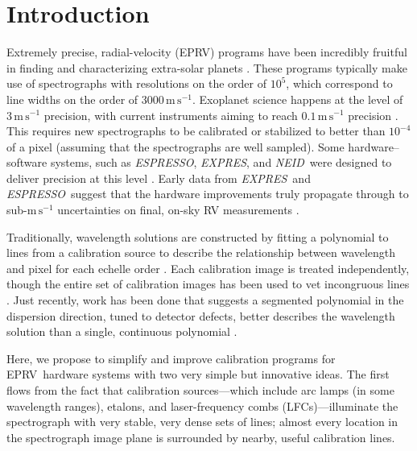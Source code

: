 \documentclass[modern]{aastex63}
\newcommand{\project}[1]{\textsl{#1}}
\newcommand{\acronym}[1]{{\small{#1}}}
\newcommand{\expres}{\project{\acronym{EXPRES}}}
\newcommand{\espresso}{\project{\acronym{ESPRESSO}}}
\newcommand{\neid}{\project{\acronym{NEID}}}
\newcommand{\eprv}{\acronym{EPRV}}
\newcommand{\lfc}{\acronym{LFC}}
\newcommand{\mps}{\mathrm{m\,s^{-1}}}
\begin{document}

\section{Introduction} 
Extremely precise, radial-velocity (\eprv) programs have been incredibly fruitful in finding and characterizing extra-solar planets \citep{mayor2011, bonfils2013, plavchan2015, butler2017}.  These programs typically make use of spectrographs with resolutions on the order of $10^5$, which correspond to line widths on the order of $3000\,\mps$.  Exoplanet science happens at the level of $3\,\mps$ precision, with current instruments aiming to reach $0.1\,\mps$ precision \citep{fischer2016}.  This requires new spectrographs to be calibrated or stabilized to better than $10^{-4}$ of a pixel (assuming that the spectrographs are well sampled).    Some hardware--software systems, such as \espresso, \expres, and \neid\ were designed to deliver precision at this level \citep{pepe2013,  jurgenson2016, neid}.  Early data from \expres\ and \espresso\ suggest that the hardware improvements truly propagate through to sub-$\mps$ uncertainties on final, on-sky RV measurements \citep{blackman2020, petersburg2020, pepe2020}.

Traditionally, wavelength solutions are constructed by fitting a polynomial to lines from a calibration source to describe the relationship between wavelength and pixel for each echelle order \citep{lovis2007, cersullo2019}.  Each calibration image is treated independently, though the entire set of calibration images has been used to vet incongruous lines \citep{coffinet2019}.  Just recently, work has been done that suggests a segmented polynomial in the dispersion direction, tuned to detector defects, better describes the wavelength solution than a single, continuous polynomial \citep{milakovic2020}.

Here, we propose to simplify and improve calibration programs for \eprv\ hardware systems with two very simple but innovative ideas.  The first flows from the fact that calibration sources---which include arc lamps (in some wavelength ranges), etalons, and laser-frequency combs (\lfc s)---illuminate the spectrograph with very stable, very dense sets of lines; almost every location in the spectrograph image plane is surrounded by nearby, useful calibration lines.
\end{document}
